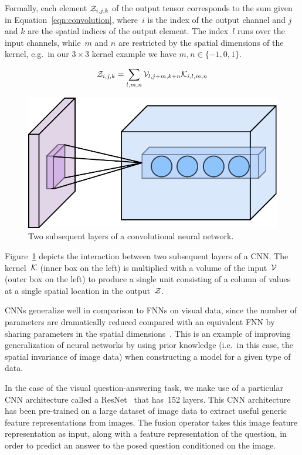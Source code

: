 Formally, each element $\mathcal{Z}_{i, j, k}$ of the output tensor corresponds to the
sum given in Equation~\ref{eqn:convolution}, where~$i$ is the index of the
output channel and $j$ and $k$ are the spatial indices of the output element.
The index~$l$ runs over the input channels, while~$m$ and $n$ are restricted by
the spatial dimensions of the kernel, e.g.\ in our $3 \times 3$ kernel example
we have $m, n \in \{-1, 0, 1\}$.

\begin{equation}
        \mathcal{Z}_{i, j, k} = \sum_{l, m, n} \mathcal{V}_{l, j + m, k + n} \mathcal{K}_{i, l, m, n}
\label{eqn:convolution}
\end{equation}

\begin{figure}
\centering
\includegraphics[width=1.0\textwidth]{Figures/cnn.pdf}
\caption{Two subsequent layers of a convolutional neural network.}
\label{fig:cnn}
\end{figure}

Figure~\ref{fig:cnn} depicts the interaction between two subsequent layers of a
CNN\@. The kernel~$\mathcal{K}$ (inner box on the left) is multiplied with a
volume of the input~$\mathcal{V}$ (outer box on the left) to produce a single unit
consisting of a column of values at a single spatial location in the
output~$\mathcal{Z}$.

CNNs generalize well in comparison to FNNs on visual data, since the number of
parameters are dramatically reduced compared with an equivalent FNN by sharing
parameters in the spatial dimensions~\cite{lecun-89}. This is an example of
improving generalization of neural networks by using prior knowledge (i.e.\ in
this case, the spatial invariance of image data) when constructing a model for
a given type of data.

In the case of the visual question-answering task, we make use of a particular
CNN architecture called a ResNet~\cite{he2016deep} that has~\num{152} layers.
This CNN architecture has been pre-trained on a large dataset of image data to
extract useful generic feature representations from images.
The fusion operator takes this image feature representation as input, along
with a feature representation of the question, in order to predict an answer to
the posed question conditioned on the image.


